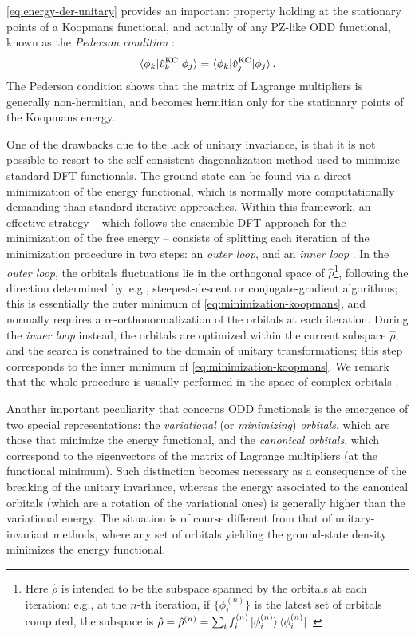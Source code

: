 %
\cref{eq:energy-der-unitary} provides an important property holding at the stationary points of a Koopmans functional, and actually of any PZ-like ODD functional, known as the \emph{Pederson condition} \cite{pederson_localdensity_1984,pederson_densityfunctional_1985}:
%
\begin{equation}
    \braket{\phi_k | \hat{v}^{\rm KC}_k | \phi_j} = \braket{\phi_k | \hat{v}^{\rm KC}_j | \phi_j} .
    \label{eq:pederson-condition}
\end{equation}
%
The Pederson condition shows that the matrix of Lagrange multipliers is generally non-hermitian, and becomes hermitian only for the stationary points of the Koopmans energy.

One of the drawbacks due to the lack of unitary invariance, is that it is not possible to resort to the self-consistent diagonalization method used to minimize standard DFT functionals. The ground state can be found via a direct minimization of the energy functional, which is normally more computationally demanding than standard iterative approaches. Within this framework, an effective strategy -- which follows the ensemble-DFT approach for the minimization of the free energy \cite{marzari_ensemble_1997} -- consists of splitting each iteration of the minimization procedure in two steps: an \emph{outer loop}, and an \emph{inner loop} \cite{borghi_variational_2015,stengel_self-interaction_2008,klupfel_optimization_2012}. In the \emph{outer loop}, the orbitals fluctuations lie in the orthogonal space of $\hat{\rho}$\footnote{Here $\hat{\rho}$ is intended to be the subspace spanned by the orbitals at each iteration: e.g., at the $n$-th iteration, if $\{ \phi_i^{(n)} \}$ is the latest set of orbitals computed, the subspace is $\hat{\rho} = \hat{\rho}^{(n)} = \sum_i f_i^{(n)} \ket{\phi_i^{(n)}}\bra{\phi_i^{(n)}}.$}, following the direction determined by, e.g., steepest-descent or conjugate-gradient algorithms; this is essentially the outer minimum of \cref{eq:minimization-koopmans}, and normally requires a re-orthonormalization of the orbitals at each iteration. During the \emph{inner loop} instead, the orbitals are optimized within the current subspace $\hat{\rho}$, and the search is constrained to the domain of unitary transformations; this step corresponds to the inner minimum of \cref{eq:minimization-koopmans}. We remark that the whole procedure is usually performed in the space of complex orbitals \cite{klupfel_importance_2011,lehtola_complex_2016}.

Another important peculiarity that concerns ODD functionals is the emergence of two special representations: the \emph{variational} (or \emph{minimizing}) \emph{orbitals}, which are those that minimize the energy functional, and the \emph{canonical orbitals}, which correspond to the eigenvectors of the matrix of Lagrange multipliers (at the functional minimum). Such distinction becomes necessary as a consequence of the breaking of the unitary invariance, whereas the energy associated to the canonical orbitals (which are a rotation of the variational ones) is generally higher than the variational energy. The situation is of course different from that of unitary-invariant methods, where any set of orbitals yielding the ground-state density minimizes the energy functional.


